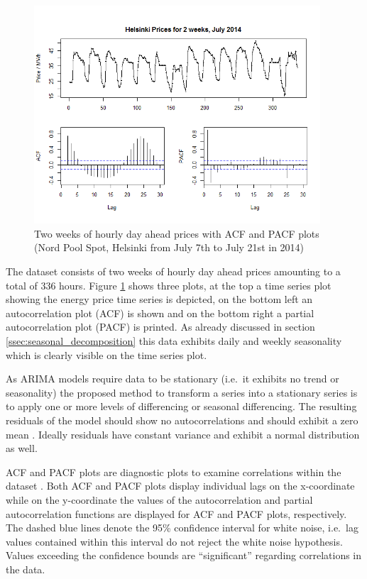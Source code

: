 \begin{figure}[htbp]
	\centering
		\includegraphics[width=0.95\textwidth]{figures/forecasting/tsdiag_prices_acf_pacf.png}
	\caption{Two weeks of hourly day ahead prices with ACF and PACF plots (Nord Pool Spot, Helsinki from July 7th to July 21st in 2014)}
	\label{fig:tsdiag_prices_acf_pacf}
\end{figure}

The dataset consists of two weeks of hourly day ahead prices amounting to a total of 336 hours. Figure \ref{fig:tsdiag_prices_acf_pacf} shows three plots, at the top a time series plot showing the energy price time series is depicted, on the bottom left an autocorrelation plot (ACF) is shown and on the bottom right a partial autocorrelation plot (PACF) is printed. 
As already discussed in section \ref{ssec:seasonal_decomposition} this data exhibits daily and weekly seasonality which is clearly visible on the time series plot. 

As ARIMA models require data to be stationary (i.e.~it exhibits no trend or seasonality) the proposed method to transform a series into a stationary series is to apply one or more levels of differencing or seasonal differencing. The resulting residuals of the model should show no autocorrelations and should exhibit a zero mean \cite{hyndman2012forecasting}. Ideally residuals have constant variance and exhibit a normal distribution as well. 

ACF and PACF plots are diagnostic plots to examine correlations within the dataset \cite{nist2012handbook,nau2016statistical}. 
Both ACF and PACF plots display individual lags on the x-coordinate while on the y-coordinate the values of the autocorrelation and partial autocorrelation functions are displayed for ACF and PACF plots, respectively. The dashed blue lines denote the 95\% confidence interval for white noise, i.e.~lag values contained within this interval do not reject the white noise hypothesis. 
Values exceeding the confidence bounds are "`significant"' regarding correlations in the data. 

